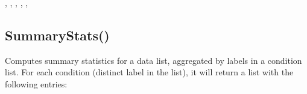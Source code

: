 \documentclass[letterpaper,10pt,english]{sphinxmanual}
\begin{document}
\sphinxAtStartPar
{}

\begin{sphinxVerbatim}[commandchars=\\\{\}]
\end{sphinxVerbatim}

\sphinxAtStartPar
{}

\begin{sphinxVerbatim}[commandchars=\\\{\}]
\PYG{p}{[}\PYG{p}{]}
\end{sphinxVerbatim}

\sphinxAtStartPar
{}

\sphinxAtStartPar
{}, , , , , 

\ignorespaces 

\subsection{SummaryStats()}
\label{\detokenize{reference/math:summarystats}}\label{\detokenize{reference/math:index-12}}
\sphinxAtStartPar
{}

\sphinxAtStartPar
Computes summary statistics for a data list,   aggregated by labels in a condition list. For each condition (distinct label in the  list), it will  return a list with the following entries:     

\sphinxAtStartPar
{}

\begin{sphinxVerbatim}[commandchars=\\\{\}]
\end{sphinxVerbatim}
\end{document}
